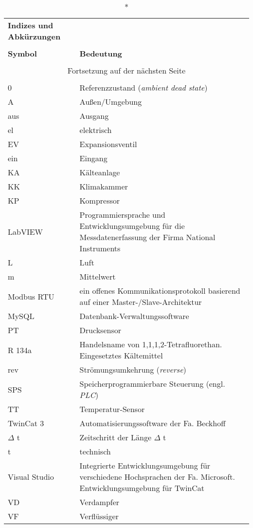 \begin{onehalfspacing}
\begin{longtable}[h]{p{} p{}}
		\caption*{\textbf{Indizes und Abkürzungen}} \\
		\\
		\textbf{Symbol} & \textbf{Bedeutung} \\ %
		\endhead
		\\
		\multicolumn{2}{c}{Fortsetzung auf der nächsten Seite} \\
		\endfoot
		\multicolumn{2}{c}{ } \\
		\endlastfoot
		
		0 & Referenzzustand (\emph{ambient dead state})\\
		A & Außen/Umgebung\\ 	
		aus & Ausgang\\	
		el & elektrisch \\
		EV & Expansionsventil\\
		ein & Eingang \\
		KA & Kälteanlage \\
		KK & Klimakammer\\
		KP & Kompressor\\
		LabVIEW & Programmiersprache und Entwicklungsumgebung für die Messdatenerfassung der Firma National Instruments\\
		L & Luft\\
		m & Mittelwert\\
		Modbus RTU & ein offenes Kommunikationsprotokoll basierend auf einer Master-/Slave-Architektur \\
		MySQL & Datenbank-Verwaltungssoftware \\
		PT & Drucksensor\\
		R 134a & Handelsname von 1,1,1,2-Tetrafluorethan. Eingesetztes Kältemittel\\ 
		rev & Strömungsumkehrung (\emph{reverse})\\
		SPS & Speicherprogrammierbare Steuerung (engl. \textit{PLC}) \\
		TT & Temperatur-Sensor\\
		TwinCat 3& Automatisierungssoftware der Fa. Beckhoff\\
		$\Delta$ t & Zeitschritt der Länge $\Delta$ t\\
		t & technisch\\
		Visual Studio & Integrierte Entwicklungsumgebung für verschiedene Hochsprachen der Fa. Microsoft. Entwicklungsumgebung für TwinCat\\
		VD & Verdampfer \\
		VF & Verflüssiger \\


\end{longtable}
\end{onehalfspacing}
